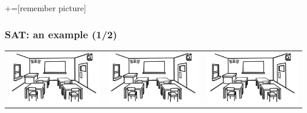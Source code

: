 \documentclass{beamer}
\begin{document}
\begin{frame}

+=[remember picture]
\frametitle{SAT: an example (1/2)}
\everymath{\displaystyle}
\centering


\begin{tabular}{ccc}
	\includegraphics[scale=0.07]{images/room} & \includegraphics[scale=0.07]{images/room}& \includegraphics[scale=0.07]{images/room}\\

\end{tabular}
\end{frame}
\end{document}
